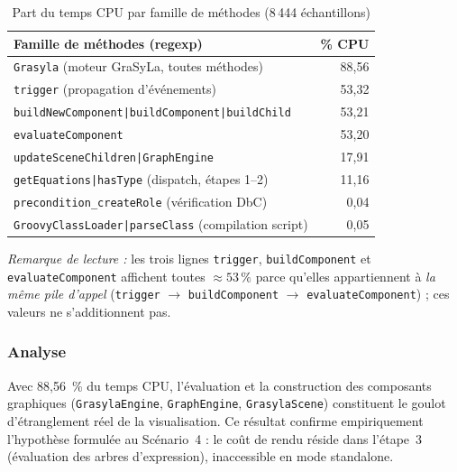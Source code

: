 \begin{table}[h]
\centering
\caption{Part du temps CPU par famille de méthodes (8\,444 échantillons)}
\label{tab:sc4-live}
\begin{tabular}{lr}
\hline
\textbf{Famille de méthodes (regexp)} & \textbf{\% CPU} \\
\hline
\texttt{Grasyla} (moteur GraSyLa, toutes méthodes)         & 88,56 \\
\texttt{trigger} (propagation d'événements)                & 53,32 \\
\texttt{buildNewComponent|buildComponent|buildChild}       & 53,21 \\
\texttt{evaluateComponent}                                 & 53,20 \\
\texttt{updateSceneChildren|GraphEngine}                   & 17,91 \\
\texttt{getEquations|hasType} (dispatch, étapes 1--2)      & 11,16 \\
\texttt{precondition\_createRole} (vérification DbC)        & 0,04 \\
\texttt{GroovyClassLoader|parseClass} (compilation script) & 0,05 \\
\hline
\end{tabular}
\end{table}

\textit{Remarque de lecture :} les trois lignes \texttt{trigger},
\texttt{buildComponent} et \texttt{evaluateComponent} affichent toutes
$\approx 53\,\%$ parce qu'elles appartiennent à \emph{la même pile d'appel}
(\texttt{trigger} $\rightarrow$ \texttt{buildComponent} $\rightarrow$
\texttt{evaluateComponent}) ; ces valeurs ne s'additionnent pas.

\subsubsection{Analyse}

Avec 88,56~\% du temps CPU, l'évaluation et la construction des composants
graphiques (\texttt{GrasylaEngine}, \texttt{GraphEngine},
\texttt{GrasylaScene}) constituent le goulot d'étranglement réel de la
visualisation. Ce résultat confirme empiriquement l'hypothèse formulée au
Scénario~4 : le coût de rendu réside dans l'étape~3 (évaluation des arbres
d'expression), inaccessible en mode standalone.

